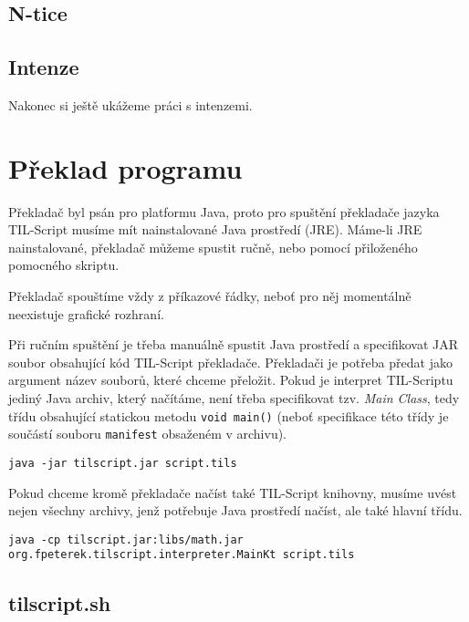 \subsection{N-tice}

\subsection{Intenze}

Nakonec si ještě ukážeme práci s intenzemi.

\section{Překlad programu}

Překladač byl psán pro platformu Java, proto pro spuštění překladače jazyka TIL-Script musíme mít
nainstalované Java prostředí (JRE). Máme-li JRE nainstalované, překladač můžeme spustit ručně, nebo
pomocí přiloženého pomocného skriptu.

Překladač spouštíme vždy z příkazové řádky, neboť pro něj momentálně neexistuje grafické rozhraní.

Při ručním spuštění je třeba manuálně spustit Java prostředí a specifikovat JAR soubor obsahující
kód TIL-Script překladače. Překladači je potřeba předat jako argument název souborů, které chceme
přeložit. Pokud je interpret TIL-Scriptu jediný Java archiv, který načítáme, není třeba specifikovat
tzv. \textit{Main Class}, tedy třídu obsahující statickou metodu \lstinline{void main()} (neboť
specifikace této třídy je součástí souboru \lstinline{manifest} obsaženém v archivu).

\begin{lstlisting}[caption={Spuštění překladače}]
java -jar tilscript.jar script.tils
\end{lstlisting}

Pokud chceme kromě překladače načíst také TIL-Script knihovny, musíme uvést nejen všechny archivy,
jenž potřebuje Java prostředí načíst, ale také hlavní třídu.

\begin{lstlisting}[caption={Spuštění překladače s načtením knihoven}]
java -cp tilscript.jar:libs/math.jar org.fpeterek.tilscript.interpreter.MainKt script.tils
\end{lstlisting}

\subsection{tilscript.sh}

